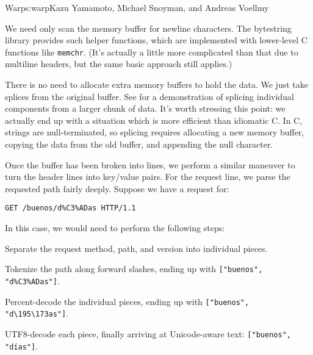 \begin{aosachapter}{Warp}{s:warp}{Kazu Yamamoto, Michael Snoyman, and Andreas Voellmy}
\begin{aosaenumerate}
\def\labelenumi{\arabic{enumi}.}
\item
  We need only scan the memory buffer for newline characters. The
  bytestring library provides such helper functions, which are
  implemented with lower-level C functions like \texttt{memchr}. (It's
  actually a little more complicated than that due to multiline headers,
  but the same basic approach still applies.)
\item
  There is no need to allocate extra memory buffers to hold the data. We
  just take splices from the original buffer. See
   for a demonstration of splicing
  individual components from a larger chunk of data. It's worth
  stressing this point: we actually end up with a situation which is
  more efficient than idiomatic C. In C, strings are null-terminated, so
  splicing requires allocating a new memory buffer, copying the data
  from the old buffer, and appending the null character.
\end{aosaenumerate}


Once the buffer has been broken into lines, we perform a similar
maneuver to turn the header lines into key/value pairs. For the request
line, we parse the requested path fairly deeply. Suppose we have a
request for:

\begin{verbatim}
GET /buenos/d%C3%ADas HTTP/1.1
\end{verbatim}

\noindent In this case, we would need to perform the following steps:

\begin{aosaenumerate}
\def\labelenumi{\arabic{enumi}.}

\item
  Separate the request method, path, and version into individual pieces.
\item
  Tokenize the path along forward slashes, ending up with
  \texttt{{[}"buenos", "d\%C3\%ADas"{]}}.
\item
  Percent-decode the individual pieces, ending up with
  \texttt{{[}"buenos", "d\textbackslash{}195\textbackslash{}173as"{]}}.
\item
  UTF8-decode each piece, finally arriving at Unicode-aware text:
  \texttt{{[}"buenos", "días"{]}}.
\end{aosaenumerate}


\end{aosachapter}
